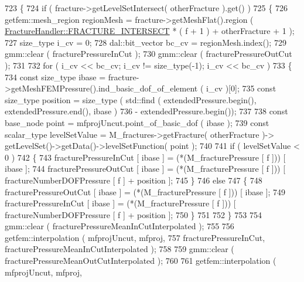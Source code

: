 \begin{DoxyCode}
723         \{
724             \textcolor{keywordflow}{if} ( fracture->getLevelSetIntersect( otherFracture ).get() )
725             \{
726                 getfem::mesh\_region regionMesh = fracture->getMeshFlat().region ( 
      \hyperlink{classFractureHandler_a495ad4fc72d0c47c8f0424842f1153aaa781cae3f3b99bf9357fed2833d315537}{FractureHandler::FRACTURE\_INTERSECT} * ( f + 1 ) + otherFracture + 1 );
727                 size\_type i\_cv = 0;
728                 dal::bit\_vector bc\_cv = regionMesh.index();
729                 gmm::clear ( fracturePressureInCut );
730                 gmm::clear ( fracturePressureOutCut );
731 
732                 \textcolor{keywordflow}{for} ( i\_cv << bc\_cv; i\_cv != size\_type(-1); i\_cv << bc\_cv )
733                 \{
734                     \textcolor{keyword}{const} size\_type ibase = fracture->getMeshFEMPressure().ind\_basic\_dof\_of\_element ( i\_cv 
      )[0];
735                     \textcolor{keyword}{const} size\_type position = size\_type ( std::find ( extendedPressure.begin(), 
      extendedPressure.end(), ibase )
736                                                 - extendedPressure.begin());
737 
738                     \textcolor{keyword}{const} base\_node point = mfprojUncut.point\_of\_basic\_dof ( ibase );
739                     \textcolor{keyword}{const} scalar\_type levelSetValue = M\_fractures->getFracture( otherFracture )->
      getLevelSet()->getData()->levelSetFunction( point );
740 
741                     \textcolor{keywordflow}{if} ( levelSetValue < 0 )
742                     \{
743                         fracturePressureInCut [ ibase ] = (*(M\_fracturePressure [ f ])) [ ibase ];
744                         fracturePressureOutCut [ ibase ] = (*(M\_fracturePressure [ f ])) [ 
      fractureNumberDOFPressure [ f ] + position ];
745                     \}
746                     \textcolor{keywordflow}{else}
747                     \{
748                         fracturePressureOutCut [ ibase ] = (*(M\_fracturePressure [ f ])) [ ibase ];
749                         fracturePressureInCut [ ibase ] = (*(M\_fracturePressure [ f ])) [ 
      fractureNumberDOFPressure [ f ] + position ];
750                     \}
751 
752                 \}
753 
754                 gmm::clear ( fracturePressureMeanInCutInterpolated );
755 
756                 getfem::interpolation ( mfprojUncut, mfproj,
757                                         fracturePressureInCut, fracturePressureMeanInCutInterpolated );
758 
759                 gmm::clear ( fracturePressureMeanOutCutInterpolated );
760 
761                 getfem::interpolation ( mfprojUncut, mfproj,

\end{DoxyCode}
